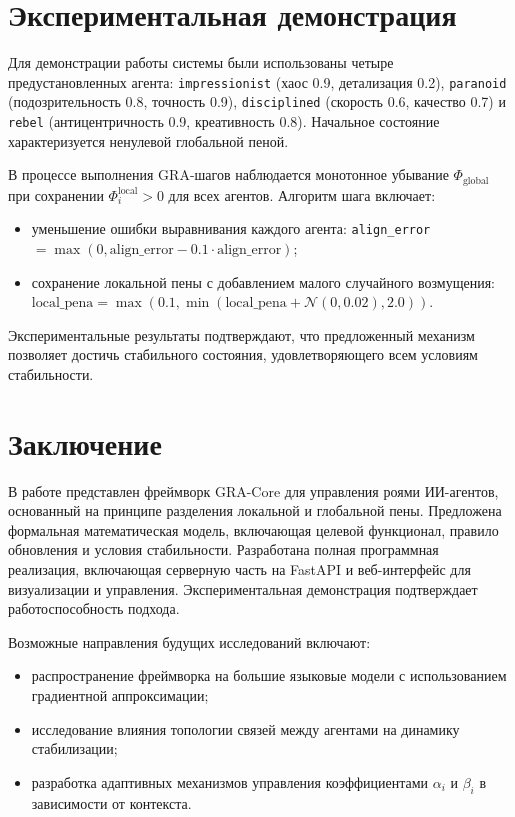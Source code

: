 \documentclass[twocolumn]{article}
\begin{document}
\section{Экспериментальная демонстрация}
Для демонстрации работы системы были использованы четыре предустановленных агента: \texttt{impressionist} (хаос 0.9, детализация 0.2), \texttt{paranoid} (подозрительность 0.8, точность 0.9), \texttt{disciplined} (скорость 0.6, качество 0.7) и \texttt{rebel} (антицентричность 0.9, креативность 0.8). Начальное состояние характеризуется ненулевой глобальной пеной.

В процессе выполнения GRA-шагов наблюдается монотонное убывание $\Phi_{\text{global}}$ при сохранении $\Phi_i^{\text{local}} > 0$ для всех агентов. Алгоритм шага включает:
\begin{itemize}
\item уменьшение ошибки выравнивания каждого агента: \texttt{align\_error} $= \max(0, \text{align\_error} - 0.1 \cdot \text{align\_error})$;
\item сохранение локальной пены с добавлением малого случайного возмущения: $\text{local\_pena} = \max(0.1, \min(\text{local\_pena} + \mathcal{N}(0, 0.02), 2.0))$.
\end{itemize}

Экспериментальные результаты подтверждают, что предложенный механизм позволяет достичь стабильного состояния, удовлетворяющего всем условиям стабильности.

\section{Заключение}
В работе представлен фреймворк GRA-Core для управления роями ИИ-агентов, основанный на принципе разделения локальной и глобальной пены. Предложена формальная математическая модель, включающая целевой функционал, правило обновления и условия стабильности. Разработана полная программная реализация, включающая серверную часть на FastAPI и веб-интерфейс для визуализации и управления. Экспериментальная демонстрация подтверждает работоспособность подхода.

Возможные направления будущих исследований включают:
\begin{itemize}
\item распространение фреймворка на большие языковые модели с использованием градиентной аппроксимации;
\item исследование влияния топологии связей между агентами на динамику стабилизации;
\item разработка адаптивных механизмов управления коэффициентами $\alpha_i$ и $\beta_i$ в зависимости от контекста.
\end{itemize}
\end{document}
